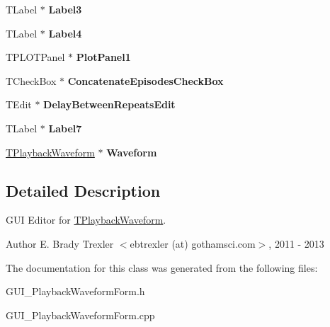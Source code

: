 \begin{DoxyCompactItemize}
\item 
\hypertarget{class_t_playback_waveform_form_a70aa53949c81bb695c00b78d82f271cf}{T\+Label $\ast$ {\bfseries Label3}}\label{class_t_playback_waveform_form_a70aa53949c81bb695c00b78d82f271cf}

\item 
\hypertarget{class_t_playback_waveform_form_a665920f138dbcbe1f842ecd9b7b6f348}{T\+Label $\ast$ {\bfseries Label4}}\label{class_t_playback_waveform_form_a665920f138dbcbe1f842ecd9b7b6f348}

\item 
\hypertarget{class_t_playback_waveform_form_a69a8cccb70f515d64b8a657a8fac8a24}{T\+P\+L\+O\+T\+Panel $\ast$ {\bfseries Plot\+Panel1}}\label{class_t_playback_waveform_form_a69a8cccb70f515d64b8a657a8fac8a24}

\item 
\hypertarget{class_t_playback_waveform_form_ac6996da2d933f13bc18a967effc3fc83}{T\+Check\+Box $\ast$ {\bfseries Concatenate\+Episodes\+Check\+Box}}\label{class_t_playback_waveform_form_ac6996da2d933f13bc18a967effc3fc83}

\item 
\hypertarget{class_t_playback_waveform_form_a6960a95e9c3e7017cec01956274992b3}{T\+Edit $\ast$ {\bfseries Delay\+Between\+Repeats\+Edit}}\label{class_t_playback_waveform_form_a6960a95e9c3e7017cec01956274992b3}

\item 
\hypertarget{class_t_playback_waveform_form_a1b338144973085568e7769b6a5d39b5d}{T\+Label $\ast$ {\bfseries Label7}}\label{class_t_playback_waveform_form_a1b338144973085568e7769b6a5d39b5d}

\item 
\hypertarget{class_t_playback_waveform_form_a697591f3fee286e078c63d5fbbfb50d7}{\hyperlink{class_t_playback_waveform}{T\+Playback\+Waveform} $\ast$ {\bfseries Waveform}}\label{class_t_playback_waveform_form_a697591f3fee286e078c63d5fbbfb50d7}

\end{DoxyCompactItemize}


\subsection{Detailed Description}
G\+U\+I Editor for \hyperlink{class_t_playback_waveform}{T\+Playback\+Waveform}. 

\begin{DoxyAuthor}{Author}
E. Brady Trexler $<$ebtrexler (at) gothamsci.\+com$>$, 2011 -\/ 2013 
\end{DoxyAuthor}


The documentation for this class was generated from the following files\+:\begin{DoxyCompactItemize}
\item 
G\+U\+I\+\_\+\+Playback\+Waveform\+Form.\+h\item 
G\+U\+I\+\_\+\+Playback\+Waveform\+Form.\+cpp\end{DoxyCompactItemize}
